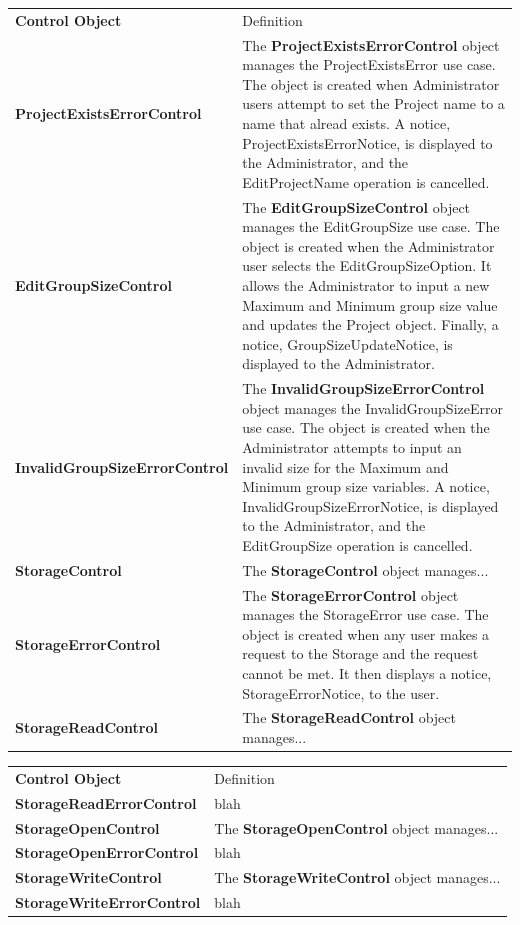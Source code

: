 \documentclass[12pt,letterpaper]{article}
\begin{document}
\begin{center}
\begin{tabu} to 
		\tableheader{}Control Object & Definition\\
		ProjectExistsErrorControl &
			The {\bf ProjectExistsErrorControl} object manages the ProjectExistsError use case. The object is created when Administrator users attempt to set 
			the Project name to a name that alread exists. A notice, ProjectExistsErrorNotice, is displayed to the Administrator, and the EditProjectName operation is cancelled.\\
		EditGroupSizeControl & 
			The {\bf EditGroupSizeControl} object manages the EditGroupSize use case. The object is created when the Administrator user selects the EditGroupSizeOption. It allows the 
			Administrator to input a new Maximum and Minimum group size value and updates the Project object. Finally, a notice, GroupSizeUpdateNotice, is displayed to the Administrator.\\
		InvalidGroupSizeErrorControl & 
			The {\bf InvalidGroupSizeErrorControl} object manages the InvalidGroupSizeError use case. The object is created when the Administrator attempts to input an invalid size for the Maximum
			and Minimum group size variables. A notice, InvalidGroupSizeErrorNotice, is displayed to the Administrator, and the EditGroupSize operation is cancelled. \\
		StorageControl & 
			The {\bf StorageControl} object manages...\\
		StorageErrorControl & 
			The {\bf StorageErrorControl} object manages the StorageError use case. The object is created when any user makes a request to the Storage and the request cannot be met.
			It then displays a notice, StorageErrorNotice, to the user.\\
		StorageReadControl & 
			The {\bf StorageReadControl} object manages...\\

\end{tabu}
\end{center}

\begin{center}
\begin{tabu} to 
		\tableheader{}Control Object & Definition\\
		StorageReadErrorControl & blah\\
		StorageOpenControl & 
			The {\bf StorageOpenControl} object manages...\\
		StorageOpenErrorControl & blah\\
		StorageWriteControl & 
			The {\bf StorageWriteControl} object manages...\\
		StorageWriteErrorControl & blah\\
\end{tabu}
\end{center}
\end{document}
